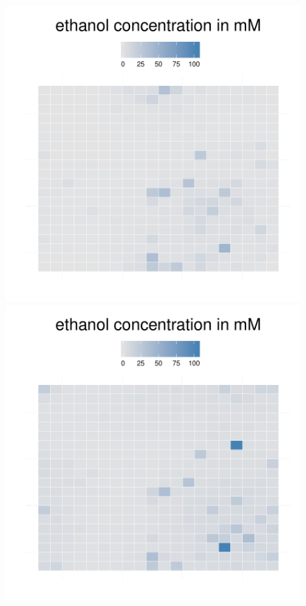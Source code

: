 \begin{figure}[h!]
{\begin{minipage}[t]{0.3\textwidth}
  \end{minipage}
  \begin{minipage}[t]{0.3\textwidth}
    \includegraphics[width=\textwidth]{../results/ecoli_beijerinckii_20x20_seed5147_eth45.pdf}
  \end{minipage}
  \begin{minipage}[t]{0.3\textwidth}
    \includegraphics[width=\textwidth]{../results/ecoli_beijerinckii_20x20_seed5147_eth60.pdf}

\end{minipage}}
\end{figure}
